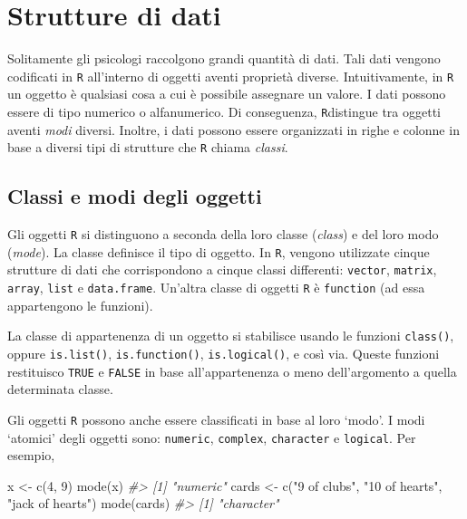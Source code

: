 \documentclass[
  11pt,
]{krantz}
\makeatletter
\newenvironment{Shaded}{\begin{snugshade}}{\end{snugshade}}
\newcommand{\CommentTok}[1]{\textcolor[rgb]{0.37,0.37,0.37}{\textit{#1}}}
\newcommand{\DecValTok}[1]{\textcolor[rgb]{0.06,0.06,0.06}{#1}}
\newcommand{\FunctionTok}[1]{\textcolor[rgb]{0,0,0}{#1}}
\newcommand{\NormalTok}[1]{#1}
\newcommand{\OtherTok}[1]{\textcolor[rgb]{0.37,0.37,0.37}{#1}}
\newcommand{\StringTok}[1]{\textcolor[rgb]{0.5,0.5,0.5}{#1}}
\newenvironment{kframe}{%
\medskip{}
\setlength{\fboxsep}{.8em}
 \def\at@end@of@kframe{}%
 \ifinner\ifhmode%
  \def\at@end@of@kframe{\end{minipage}}%
  \begin{minipage}{\columnwidth}%
 \fi\fi%
 \def\FrameCommand##1{\hskip\@totalleftmargin \hskip-\fboxsep
 \colorbox{shadecolor}{##1}\hskip-\fboxsep
     \hskip-\linewidth \hskip-\@totalleftmargin \hskip\columnwidth}%
 \MakeFramed {\advance\hsize-\width
   \@totalleftmargin\z@ \linewidth\hsize
   \@setminipage}}%
 {\par\unskip\endMakeFramed%
 \at@end@of@kframe}
\renewenvironment{Shaded}{\begin{kframe}}{\end{kframe}}
\theoremstyle{definition}
\theoremstyle{definition}
\theoremstyle{definition}
\theoremstyle{definition}
\theoremstyle{remark}
\makeatother
\begin{document}
\hypertarget{chapter-strutture-dati}{%
\section{Strutture di dati}\label{chapter-strutture-dati}}

Solitamente gli psicologi raccolgono grandi quantità di dati. Tali dati vengono codificati in \texttt{R} all'interno di oggetti aventi proprietà diverse. Intuitivamente, in \texttt{R} un oggetto è qualsiasi cosa a cui è possibile assegnare un valore. I dati possono essere di tipo numerico o alfanumerico. Di conseguenza, \texttt{R}distingue tra oggetti aventi \emph{modi} diversi. Inoltre, i dati possono essere organizzati in righe e colonne in base a diversi tipi di strutture che \texttt{R} chiama \emph{classi}.

\hypertarget{classi-e-modi-degli-oggetti}{%
\subsection{Classi e modi degli oggetti}\label{classi-e-modi-degli-oggetti}}

Gli oggetti \texttt{R} si distinguono a seconda della loro classe (\emph{class}) e del loro modo (\emph{mode}). La classe definisce il tipo di oggetto. In \texttt{R}, vengono utilizzate cinque strutture di dati che corrispondono a cinque classi differenti: \texttt{vector}, \texttt{matrix}, \texttt{array}, \texttt{list} e \texttt{data.frame}. Un'altra classe di oggetti \texttt{R} è \texttt{function} (ad essa appartengono le funzioni).

La classe di appartenenza di un oggetto si stabilisce usando le funzioni \texttt{class()}, oppure \texttt{is.list()}, \texttt{is.function()}, \texttt{is.logical()}, e così via. Queste funzioni restituisco \texttt{TRUE} e \texttt{FALSE} in base all'appartenenza o meno dell'argomento a quella determinata classe.

Gli oggetti \texttt{R} possono anche essere classificati in base al loro `modo'. I modi `atomici' degli oggetti sono: \texttt{numeric}, \texttt{complex}, \texttt{character} e \texttt{logical}. Per esempio,

\begin{Shaded}
\begin{Highlighting}[]
\NormalTok{x }\OtherTok{\textless{}{-}} \FunctionTok{c}\NormalTok{(}\DecValTok{4}\NormalTok{, }\DecValTok{9}\NormalTok{)}
\FunctionTok{mode}\NormalTok{(x)}
\CommentTok{\#\textgreater{} [1] "numeric"}
\NormalTok{cards }\OtherTok{\textless{}{-}} \FunctionTok{c}\NormalTok{(}\StringTok{"9 of clubs"}\NormalTok{, }\StringTok{"10 of hearts"}\NormalTok{, }\StringTok{"jack of hearts"}\NormalTok{) }
\FunctionTok{mode}\NormalTok{(cards)}
\CommentTok{\#\textgreater{} [1] "character"}
\end{Highlighting}
\end{Shaded}
\end{document}
